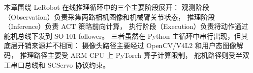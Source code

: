 本章围绕 LeRobot 在线推理循环中的三个主要阶段展开：
观测阶段（Observation）负责采集两路相机图像和机械臂关节状态，
推理阶段（Inference）负责 ACT 策略前向计算，
执行阶段（Execution）负责将动作通过舵机总线下发到 SO-101 follower。
三者虽然在 Python 主循环中串行出现，但其底层开销来源并不相同：
摄像头路径主要经过 OpenCV/V4L2 和用户态图像解码，
推理路径主要受 ARM CPU 上 PyTorch 算子计算限制，
舵机路径则受半双工串口总线和 SCServo 协议约束。





